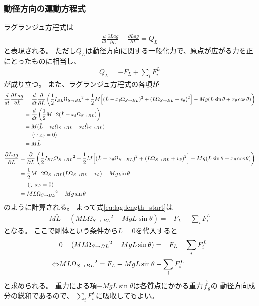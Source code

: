 \documentclass[a4paper,11pt]{jsarticle}
\begin{document}
\subsubsection*{動径方向の運動方程式}
ラグランジュ方程式は
\begin{align}
  \frac{d}{dt}\frac{\partial Lag}{\partial \dot{L}} - \frac{\partial Lag}{\partial L} = Q_L
  \label{eq:lag:length_start}
\end{align}
と表現される。
ただし$Q_L$は動径方向に関する一般化力で、原点が広がる力を正にとったものに相当し、
\begin{align*}
  Q_L = -F_L +  \sum_i F_i^L
\end{align*}
が成り立つ。
また、ラグランジュ方程式の各項が
\begin{align*}
  \frac{d}{dt}\frac{\partial Lag}{\partial \dot{L}}
  &= \frac{d}{dt}\frac{\partial }{\partial \dot{L}}
  \left(
    \frac{1}{2}I_{BL}\Omega_{S\rightarrow BL}{}^2
    + \frac{1}{2}M
    \Bigl[ (\dot{L} - x_\theta \Omega_{S\rightarrow BL}{})^2 + (L\Omega_{S\rightarrow BL}{} + v_\theta)^2 \Bigr]
    - Mg ( L\sin\theta + x_\theta \cos\theta )
  \right)
  \\
  & = \frac{d}{dt}\left( \frac{1}{2}M \cdot 2(\dot{L} - x_\theta \Omega_{S\rightarrow BL}{})\right)
  \\
  &= M( \ddot{L} - v_\theta \Omega_{S\rightarrow BL}{} - x_\theta \dot\Omega_{S\rightarrow BL}{} )
  \\
  & \ \ \ \ \left( \because x_\theta = 0 \right)
  \\
  &= M \ddot{L}
\end{align*}
\begin{align*}
  \frac{\partial Lag}{\partial L}
  &= \frac{\partial }{\partial L}
  \left(
    \frac{1}{2}I_{BL}\Omega_{S\rightarrow BL}{}^2
    + \frac{1}{2}M
    \Bigl[ (\dot{L} - x_\theta \Omega_{S\rightarrow BL}{})^2 + (L\Omega_{S\rightarrow BL}{} + v_\theta)^2 \Bigr]
    - Mg ( L\sin\theta + x_\theta \cos\theta )
  \right)
  \\
  &= \frac{1}{2}M \cdot 2\Omega_{S\rightarrow BL}{}(L\Omega_{S\rightarrow BL}{} + v_\theta) - Mg\sin\theta
  \\
  & \ \ \ \ \left( \because x_\theta = 0 \right)
  \\
  &= ML\Omega_{S\rightarrow BL}{}^2 - Mg\sin\theta
\end{align*}
のように計算される。
よって式\ref{eq:lag:length_start}は
\begin{align*}
  M\ddot{L} - ( ML\Omega_{S\rightarrow BL}{}^2 - MgL\sin\theta ) = -F_L + \sum_i F_i^L
\end{align*}
となる。
ここで剛体という条件から$\ddot{L} = 0$を代入すると
\begin{align}
  & 0 - ( ML\Omega_{S\rightarrow BL}{}^2 - MgL\sin\theta ) = -F_L + \sum_i F_i^L
  \notag
  \\
  \Leftrightarrow
  & ML\Omega_{S\rightarrow BL}{}^2 = F_L + MgL\sin\theta - \sum_i F_i^L
  \label{eq:lag:length_end}
\end{align}
と求められる。
重力による項$-MgL\sin\theta$は各質点にかかる重力$\vec{f}_g$の
動径方向成分の総和であるので、
$\sum_i F_i^L$に吸収してもよい。
\end{document}

